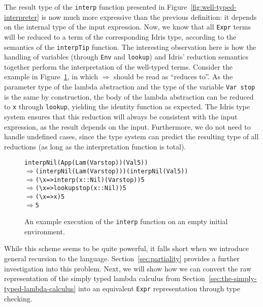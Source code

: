The result type of the \texttt{interp} function presented in Figure~\ref{fig:well-typed-interpreter} is now much more expressive than the previous definition: it depends on the internal type of the input expression. Now, we know that all \texttt{Expr} terms will be reduced to a term of the corresponding Idris type, according to the semantics of the \texttt{interpTip} function. The interesting observation here is how the handling of variables (through \texttt{Env} and \texttt{lookup}) and Idris' reduction semantics together perform the interpretation of the well-typed terms. Consider the example in Figure~\ref{fig:well-typed-interpreter-example}, in which $\Rightarrow$ should be read as ``reduces to''. As the parameter type of the lambda abstraction and the type of the variable \texttt{Var stop} is the same by construction, the body of the lambda abstraction can be reduced to \texttt{x} through \texttt{lookup}, yielding the identity function as expected. The Idris type system ensures that this reduction will always be consistent with the input expression, as the result depends on the input. Furthermore, we do not need to handle undefined cases, since the type system can predict the resulting type of all reductions (as long as the interpretation function is total).

\begin{figure}
\begin{alltt}
interp Nil (App (Lam (Var stop)) (Val 5))
\(\Rightarrow\) (interp Nil (Lam (Var stop))) (interp Nil (Val 5))
\(\Rightarrow\) (\textbackslash{x} => interp (x :: Nil) (Var stop)) 5
\(\Rightarrow\) (\textbackslash{x} => lookup stop (x :: Nil)) 5
\(\Rightarrow\) (\textbackslash{x} => x) 5
\(\Rightarrow\) 5
\end{alltt}
\caption{An example execution of the \texttt{interp} function on an empty initial environment.}
\label{fig:well-typed-interpreter-example}
\end{figure}

While this scheme seems to be quite powerful, it falls short when we introduce general recursion to the language. Section~\ref{sec:partiality} provides a further investigation into this problem. Next, we will show how we can convert the raw representation of the simply typed lambda calculus from Section~\ref{sec:the-simply-typed-lambda-calculus} into an equivalent \texttt{Expr} representation through type checking.
